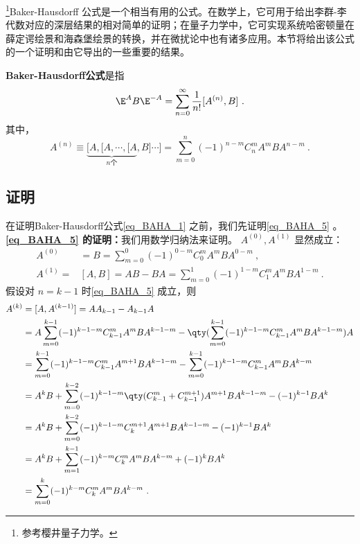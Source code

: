 \begin{issues}
\end{issues}


\footnote{参考樱井量子力学\cite{Sakurai}。}Baker-Hausdorff 公式是一个相当有用的公式。在数学上，它可用于给出李群-李代数对应的深层结果的相对简单的证明；在量子力学中，它可实现系统哈密顿量在薛定谔绘景和海森堡绘景的转换，并在微扰论中也有诸多应用。本节将给出该公式的一个证明和由它导出的一些重要的结果。

\textbf{Baker-Hausdorff公式}是指
\begin{equation}\label{eq_BAHA_1}
\E ^{A}B\E^{-A}=\sum_{n=0}^{\infty}\frac{1}{n!}[A^{(n)},B]~.
\end{equation}
其中，
\begin{equation}\label{eq_BAHA_5}
A^{(n)}\equiv\underbrace{[A,[A,\cdots,[A}_{n\text{个}},B]\cdots]
=\sum_{m=0}^{n}(-1)^{n-m}C_{n}^{m}A^mBA^{n-m}~.
\end{equation}


\subsection{证明}
在证明Baker-Hausdorff公式\autoref{eq_BAHA_1} 之前，我们先证明\autoref{eq_BAHA_5} 。\\

\textbf{\autoref{eq_BAHA_5} 的证明：}我们用数学归纳法来证明。
$A^{(0)},A^{(1)}$ 显然成立：
\begin{equation}
\begin{aligned}
A^{(0)}&=B=\sum_{m=0}^{0}(-1)^{0-m}C_{0}^{m}A^mBA^{0-m}~,\\
A^{(1)}=&[A,B]=AB-BA=\sum_{m=0}^{1}(-1)^{1-m}C_{1}^{m}A^mBA^{1-m}~.
\end{aligned}
\end{equation}
假设对 $n=k-1$ 时\autoref{eq_BAHA_5} 成立，则
\begin{equation}
\begin{aligned}
A^{(k)}&=[A,A^{(k-1)}]=AA_{k-1}-A_{k-1}A\\
&=A\sum_{m=0}^{k-1}(-1)^{k-1-m}C_{k-1}^{m}A^mBA^{k-1-m}-\qty(\sum_{m=0}^{k-1}(-1)^{k-1-m}C_{k-1}^{m}A^mBA^{k-1-m})A\\
&=\sum_{m=0}^{k-1}(-1)^{k-1-m}C_{k-1}^{m}A^{m+1}BA^{k-1-m}-\sum_{m=0}^{k-1}(-1)^{k-1-m}C_{k-1}^{m}A^mBA^{k-m}\\
&=A^{k}B+\sum_{m=0}^{k-2}(-1)^{k-1-m}\qty(C_{k-1}^{m}+C_{k-1}^{m+1})A^{m+1}BA^{k-1-m}-(-1)^{k-1}BA^k\\
&=A^{k}B+\sum_{m=0}^{k-2}(-1)^{k-1-m}C_{k}^{m+1}A^{m+1}BA^{k-1-m}-(-1)^{k-1}BA^k\\
&=A^{k}B+\sum_{m=1}^{k-1}(-1)^{k-m}C_{k}^{m}A^{m}BA^{k-m}+(-1)^{k}BA^k\\
&=\sum_{m=0}^{k}(-1)^{k-m}C_{k}^{m}A^{m}BA^{k-m}~.
\end{aligned}
\end{equation}


